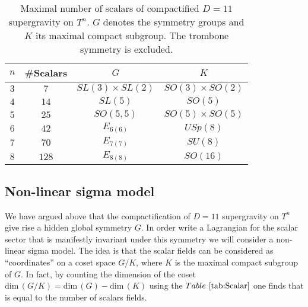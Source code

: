 \begin{table}[]
    \centering
    \caption{Maximal number of scalars of compactified $D=11$ supergravity on $T^n$. $G$ denotes the symmetry groups and $K$ its maximal compact subgroup. The trombone symmetry is excluded.}
    \label{tab:Scalar}
    \begin{tabular}{|c|c|c|c|}\hline
         $n$ & \#Scalars & $G$ & $K$ \\\hline
         $3$ & $7$ & $SL(3)\times SL(2)$ & $SO(3)\times SO(2)$\\\hline
         $4$ & $14$ & $SL(5)$ & $SO(5)$ \\\hline
         $5$ & $25$ & $SO(5,5)$ & $SO(5)\times SO(5)$ \\\hline
         $6$ & $42$ & $E_{6(6)}$ & $USp(8)$ \\\hline
         $7$ & $70$ & $E_{7(7)}$ & $SU(8)$ \\\hline
         $8$ & $128$ & $E_{8(8)}$ & $SO(16)$ \\\hline
    \end{tabular}
\end{table}

\subsection{Non-linear sigma model}
We have argued above that the compactification of $D=11$ supergravity on $T^n$ give rise a hidden global symmetry $G$. In order write a Lagrangian for the scalar sector that is manifestly invariant under this symmetry we will consider a non-linear sigma model. The idea is that the scalar fields can be considered as ``coordinates'' on a coset space $G/K$, where $K$ is the maximal compact subgroup of $G$. In fact, by counting the dimension of the coset $\text{dim}\,(G/K)=\text{dim}\,(G)-\text{dim}\,(K)$ using the $\tabref{tab:Scalar}$ one finds that is equal to the number of scalars fields. 


